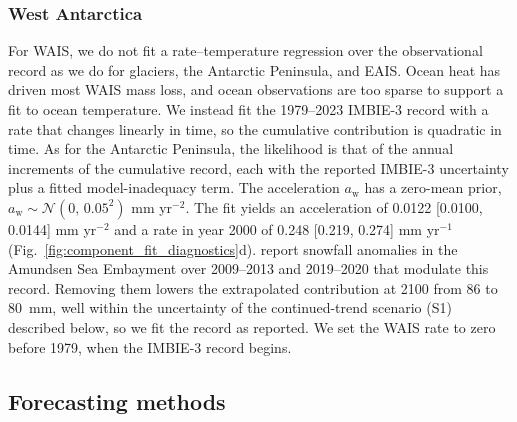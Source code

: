 \documentclass[draft,linenumbers]{agujournal2025}
\begin{document}
\subsubsection{West Antarctica}

For WAIS, we do not fit a rate--temperature regression over the observational record as we do for glaciers, the Antarctic Peninsula, and EAIS. Ocean heat has driven most WAIS mass loss, and ocean observations are too sparse to support a fit to ocean temperature. We instead fit the 1979--2023 IMBIE-3 record \citep{Otosaka2026} with a rate that changes linearly in time, so the cumulative contribution is quadratic in time. As for the Antarctic Peninsula, the likelihood is that of the annual increments of the cumulative record, each with the reported IMBIE-3 uncertainty plus a fitted model-inadequacy term. The acceleration $a_{\mathrm{w}}$ has a zero-mean prior, $a_{\mathrm{w}} \sim \mathcal{N}(0,\,0.05^2)$ mm yr$^{-2}$. The fit yields an acceleration of 0.0122 [0.0100, 0.0144] mm yr$^{-2}$ and a rate in year 2000 of 0.248 [0.219, 0.274] mm yr$^{-1}$ (Fig.~\ref{fig:component_fit_diagnostics}d). \citet{Davison2023} report snowfall anomalies in the Amundsen Sea Embayment over 2009--2013 and 2019--2020 that modulate this record. Removing them lowers the extrapolated contribution at 2100 from 86 to 80~mm, well within the uncertainty of the continued-trend scenario (S1) described below, so we fit the record as reported. We set the WAIS rate to zero before 1979, when the IMBIE-3 record begins.


\subsection{Forecasting methods}
\label{s:forecasting_model}
\end{document}
